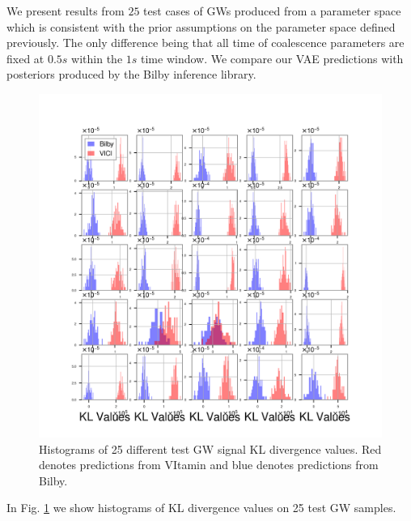 \documentclass[%
showpacs,
 amsmath,amssymb,
 aps,
 twocolumn,
 prl,
 reprint,
floatfix,
]{revtex4-1}
\begin{document}
%
%
We present results from $25$ test cases of GWs produced from 
a parameter space which is consistent with the prior assumptions  
on the parameter space defined previously. The only difference 
being that all time of coalescence parameters are fixed 
at $0.5s$ within the $1s$ time window. We compare our 
VAE predictions with posteriors produced by the Bilby
inference library.

%
%
\begin{figure}
    \includegraphics[width=\columnwidth]{images/hist-kl_0.png}
    \caption{\label{fig:kl_results} Histograms of 
    25 different test GW signal KL divergence values. 
    Red denotes predictions from VItamin and blue 
    denotes predictions from Bilby.}
\end{figure}

In Fig. \ref{fig:kl_results} we show histograms of KL divergence 
values on 25 test GW samples. 
\end{document}
